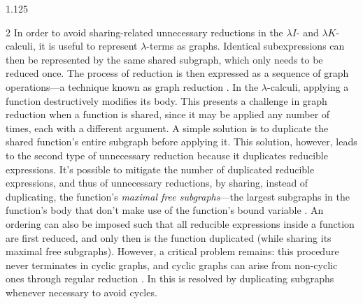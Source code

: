 \documentclass[10pt]{article}
\begin{document}
\begin{spacing}{1.125}
\begin{multicols}{2}
In order to avoid sharing-related unnecessary reductions in the \mbox{$\lambda I$-} and \mbox{$\lambda K$-calculi}, it is useful to represent \mbox{$\lambda$-terms} as graphs.
Identical subexpressions can then be represented by the same shared subgraph, which only needs to be reduced once. The process of reduction is then expressed as a sequence of graph operations---a technique known as graph reduction \cite{Wad71}.
In the \mbox{$\lambda$-calculi}, applying a function destructively modifies its body. This presents a challenge in graph reduction when a function is shared, since it may be applied any number of times, each with a different argument. A simple solution is to duplicate the shared function's entire subgraph before applying it. This solution, however, leads to the second type of unnecessary reduction because it duplicates reducible expressions. It's possible to mitigate the number of duplicated reducible expressions, and thus of unnecessary reductions, by sharing, instead of duplicating, the function's \textit{maximal free subgraphs}---the largest subgraphs in the function's body that don't make use of the function's bound variable \cite{Wad71}.
An ordering can also be imposed such that all reducible expressions inside a function are first reduced, and only then is the function duplicated (while sharing its maximal free subgraphs). However, a critical problem remains: this procedure never terminates in cyclic graphs, and cyclic graphs can arise from non-cyclic ones through regular reduction \cite{Wad71}. In \cite{Wad71} this is resolved by duplicating subgraphs whenever necessary to avoid cycles.


\end{multicols}
\end{spacing}
\end{document}
